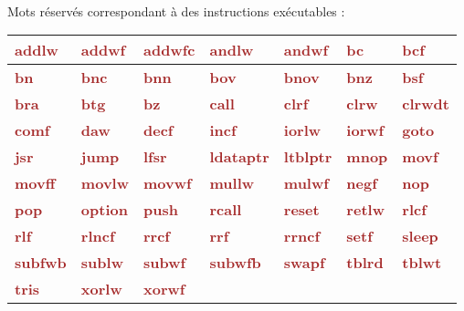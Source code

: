 ~\\
Mots réservés correspondant à des instructions exécutables :\\

\newcommand\keyWordInstruction[1]{\textcolor{brown}{\bf#1}}

\begin{tabular}{|l|l|l|l|l|l|l|}
  \hline
    \keyWordInstruction{addlw} & \keyWordInstruction{addwf} & \keyWordInstruction{addwfc} & \keyWordInstruction{andlw} & \keyWordInstruction{andwf} & \keyWordInstruction{bc} & \keyWordInstruction{bcf} \\
  \hline
    \keyWordInstruction{bn} & \keyWordInstruction{bnc} & \keyWordInstruction{bnn} & \keyWordInstruction{bov} & \keyWordInstruction{bnov} & \keyWordInstruction{bnz} & \keyWordInstruction{bsf} \\
  \hline
    \keyWordInstruction{bra} & \keyWordInstruction{btg} & \keyWordInstruction{bz} & \keyWordInstruction{call} & \keyWordInstruction{clrf} & \keyWordInstruction{clrw} & \keyWordInstruction{clrwdt} \\
  \hline
    \keyWordInstruction{comf} & \keyWordInstruction{daw} & \keyWordInstruction{decf} & \keyWordInstruction{incf} & \keyWordInstruction{iorlw} & \keyWordInstruction{iorwf} & \keyWordInstruction{goto} \\
  \hline
    \keyWordInstruction{jsr} & \keyWordInstruction{jump} & \keyWordInstruction{lfsr} & \keyWordInstruction{ldataptr} & \keyWordInstruction{ltblptr} & \keyWordInstruction{mnop} & \keyWordInstruction{movf} \\
  \hline
    \keyWordInstruction{movff} & \keyWordInstruction{movlw} & \keyWordInstruction{movwf} & \keyWordInstruction{mullw} & \keyWordInstruction{mulwf} & \keyWordInstruction{negf} & \keyWordInstruction{nop} \\
  \hline
    \keyWordInstruction{pop} & \keyWordInstruction{option} & \keyWordInstruction{push} & \keyWordInstruction{rcall} & \keyWordInstruction{reset} & \keyWordInstruction{retlw} & \keyWordInstruction{rlcf} \\
  \hline
    \keyWordInstruction{rlf} & \keyWordInstruction{rlncf} & \keyWordInstruction{rrcf} & \keyWordInstruction{rrf} & \keyWordInstruction{rrncf} & \keyWordInstruction{setf} & \keyWordInstruction{sleep} \\
  \hline
    \keyWordInstruction{subfwb} & \keyWordInstruction{sublw} & \keyWordInstruction{subwf} & \keyWordInstruction{subwfb} & \keyWordInstruction{swapf} & \keyWordInstruction{tblrd} & \keyWordInstruction{tblwt}\\
  \hline
    \keyWordInstruction{tris} & \keyWordInstruction{xorlw} & \keyWordInstruction{xorwf} & & & & \\
  \hline
\end{tabular}

